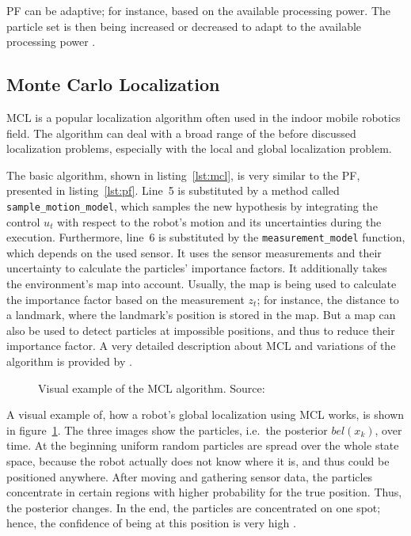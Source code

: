 \ac{PF} can be adaptive; for instance, based on the available processing power. The particle set is then being increased or decreased to adapt to the available processing power \citep{thrun:prob_robo}.


\subsection{Monte Carlo Localization}\label{sec:fund_mcl}
\ac{MCL} is a popular localization algorithm often used in the indoor mobile robotics field. The algorithm can deal with a broad range of the before discussed localization problems, especially with the local and global localization problem.



The basic algorithm, shown in listing~\ref{lst:mcl}, is very similar to the \ac{PF}, presented in listing~\ref{lst:pf}. Line~5 is substituted by a method called \texttt{sample\_motion\_model}, which samples the new hypothesis by integrating the control $u_t$ with respect to the robot's motion and its uncertainties during the execution. Furthermore, line~6 is substituted by the \texttt{measurement\_model} function, which depends on the used sensor. It uses the sensor measurements and their uncertainty to calculate the particles' importance factors. It additionally takes the environment's map into account. Usually, the map is being used to calculate the importance factor based on the measurement $z_t$; for instance, the distance to a landmark, where the landmark's position is stored in the map. But a map can also be used to detect particles at impossible positions, and thus to reduce their importance factor. A very detailed description about \acl{MCL} and variations of the algorithm is provided by \citet{thrun:prob_robo}.

\begin{figure}[width=0.9\textwidth, height=0.4\textheight]
	
	\caption{Visual example of the \ac{MCL} algorithm. Source:~\citep{thrun:prob_robo}}
	\label{fig:mcl}
\end{figure}

A visual example of, how a robot's global localization using \ac{MCL} works, is shown in figure~\ref{fig:mcl}. The three images show the particles, i.e.\ the posterior $bel(x_k)$, over time. At the beginning uniform random particles are spread over the whole state space, because the robot actually does not know where it is, and thus could be positioned anywhere. After moving and gathering sensor data, the particles concentrate in certain regions with higher probability for the true position. Thus, the posterior changes. In the end, the particles are concentrated on one spot; hence, the confidence of being at this position is very high \citep{thrun:prob_robo}.


